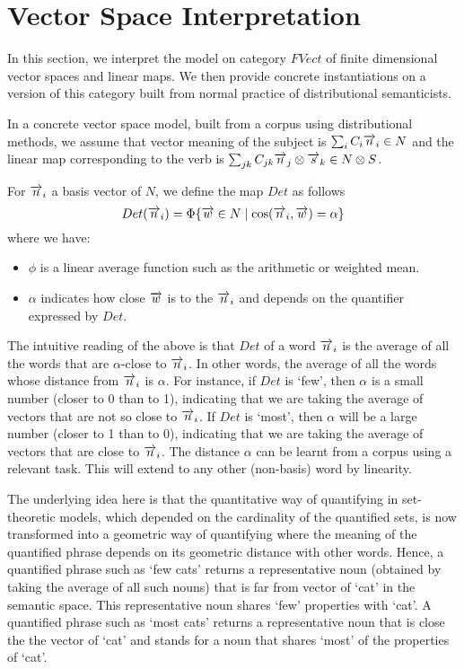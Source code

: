 \section{Vector Space Interpretation}


In this section, we interpret the model on category $FVect$ of finite dimensional vector spaces and linear maps. We then provide concrete instantiations on a version of this category built from normal practice of distributional semanticists. 

In a concrete vector space model, built from a corpus using distributional methods, we assume that  vector meaning of the subject is $\sum_i C_i \overrightarrow{n}_i \in N$ and the linear map corresponding to the verb is $\sum_{jk} C_{jk} \overrightarrow{n}_j \otimes \overrightarrow{s}_k \in N \otimes S$. 

For $\overrightarrow{n}_i$ a basis vector of $N$, we define  the map $Det$  as follows 
\[
Det(\overrightarrow{n}_i) = \Phi \{\overrightarrow{w} \in N \mid \cos(\overrightarrow{n}_i, \overrightarrow{w}) = \alpha\}
\]
where we have:
\begin{itemize}
\item  $\phi$ is a linear average function such as the   arithmetic or weighted mean. 
\item  $\alpha$ indicates how close $\overrightarrow{w}$ is to the $\overrightarrow{n}_i$ and depends on the quantifier expressed by $Det$. 
\end{itemize}

\noindent
The intuitive reading of the above is that $Det$ of a word $\overrightarrow{n}_i$ is the average of all the words that are $\alpha$-close to $\overrightarrow{n}_i$. In other words, the average of all the words  whose distance from $\overrightarrow{n}_i$ is $\alpha$.  For instance, if $Det$ is `few', then $\alpha$ is a small number (closer to 0 than to 1), indicating that we are taking the average of vectors that are not so close to $\overrightarrow{n}_i$. If $Det$ is `most', then $\alpha$ will be a large number (closer to 1 than to 0), indicating that we are taking the average of vectors that are close to $\overrightarrow{n}_i$. The distance $\alpha$ can be learnt from a corpus using a relevant task. This will extend to any other (non-basis) word by linearity.  

The underlying idea here is that the quantitative way of quantifying in set-theoretic models, which depended on the cardinality of the quantified sets, is now transformed into a geometric way of quantifying where the meaning of the quantified phrase depends on its geometric distance with other words. Hence, a quantified phrase such as `few cats' returns a representative noun (obtained by taking the average of all such nouns) that is far from vector of  `cat'  in the semantic space. This representative noun shares `few' properties with `cat'. A quantified phrase such as `most cats' returns a representative noun that is close the the vector of `cat' and stands for a noun that shares `most' of the properties of `cat'. 


